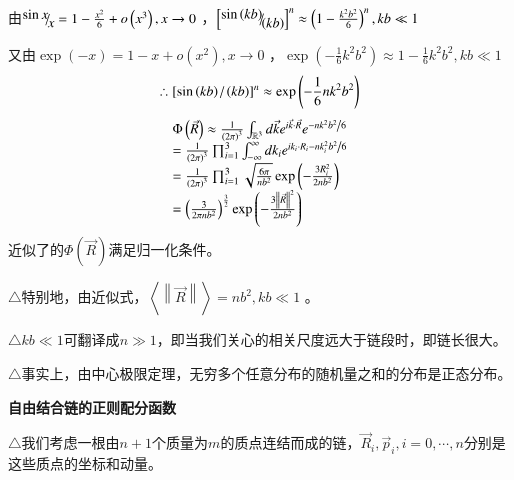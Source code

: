 \documentclass{article} %
\begin{document}
\noindent 由${\raise0.7ex\hbox{$ \sin x $}\!\mathord{\left/ {\vphantom {\sin x x}} \right. \kern-\nulldelimiterspace}\!\lower0.7ex\hbox{$ x $}} =1-\frac{x^{2} }{6} +o\left(x^{3} \right),x\to 0$ ，$\left[{\raise0.7ex\hbox{$ \sin \left(kb\right) $}\!\mathord{\left/ {\vphantom {\sin \left(kb\right) \left(kb\right)}} \right. \kern-\nulldelimiterspace}\!\lower0.7ex\hbox{$ \left(kb\right) $}} \right]^{n} \approx \left(1-\frac{k^{2} b^{2} }{6} \right)^{n} ,kb\ll 1$ 

\noindent 又由$\exp \left(-x\right)=1-x+o\left(x^{2} \right),x\to 0$ ，$\exp \left(-\frac{1}{6} k^{2} b^{2} \right)\approx 1-\frac{1}{6} k^{2} b^{2} ,kb\ll 1$ 
\[\therefore \left[{\sin \left(kb\right)\mathord{\left/ {\vphantom {\sin \left(kb\right) \left(kb\right)}} \right. \kern-\nulldelimiterspace} \left(kb\right)} \right]^{n} \approx \exp \left(-\frac{1}{6} nk^{2} b^{2} \right)\] 
\[\begin{array}{l} {\Phi \left(\vec{R}\right)\approx \frac{{\rm 1}}{\left({\rm 2}\pi \right)^{{\rm 3}} } \int _{{\mathbb R}^{3} }d\vec{k} e^{i\vec{k}\cdot \vec{R}} e^{-{nk^{2} b^{2} \mathord{\left/ {\vphantom {nk^{2} b^{2}  6}} \right. \kern-\nulldelimiterspace} 6} } } \\ {=\frac{{\rm 1}}{\left({\rm 2}\pi \right)^{{\rm 3}} } \prod _{i=1}^{3}\int _{-\infty }^{\infty }dk_{i}   e^{ik_{i} \cdot R_{i} -{nk_{i}^{2} b^{2} \mathord{\left/ {\vphantom {nk_{i}^{2} b^{2}  6}} \right. \kern-\nulldelimiterspace} 6} } } \\ {=\frac{{\rm 1}}{\left({\rm 2}\pi \right)^{{\rm 3}} } \prod _{i=1}^{3}\sqrt{\frac{6\pi }{nb^{2} } }  \exp \left(-\frac{3R_{i}^{2} }{2nb^{2} } \right)} \\ {=\left(\frac{3}{2\pi nb^{2} } \right)^{\frac{3}{2} } \exp \left(-\frac{3\left\| \vec{R}\right\| ^{2} }{2nb^{2} } \right)} \end{array}\] 
近似了的$\Phi \left(\vec{R}\right)$满足归一化条件。

\noindent $\mathrm{\triangle}$特别地，由近似式，$\left\langle \left\| \vec{R}\right\| \right\rangle =nb^{2} ,kb\ll 1$ 。

\noindent $\mathrm{\triangle}$$kb\ll 1$可翻译成$n\gg 1$，即当我们关心的相关尺度远大于链段时，即链长很大。

\noindent $\mathrm{\triangle}$事实上，由中心极限定理，无穷多个任意分布的随机量之和的分布是正态分布。 

\noindent \eject 

\noindent \textbf{自由结合链的正则配分函数}

\noindent $\mathrm{\triangle}$我们考虑一根由$n+1$个质量为$m$的质点连结而成的链，$\vec{R}_{i} ,\vec{p}_{i} ,i=0,\cdots ,n$分别是这些质点的坐标和动量。
\end{document}
